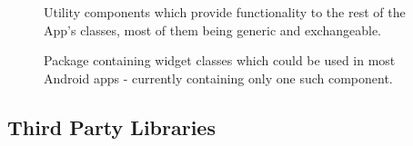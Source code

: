 \begin{figure}[H]
  \centering
  \caption{Utility components which provide functionality to the rest of the App's classes, most of them being generic and exchangeable.}
  \label{fig:package-util}
\end{figure}

\begin{figure}[H]
  \centering
  \caption{Package containing widget classes which could be used in most Android apps - currently containing only one such component.}
  \label{fig:package-widget}
\end{figure}

\subsection{Third Party Libraries}

